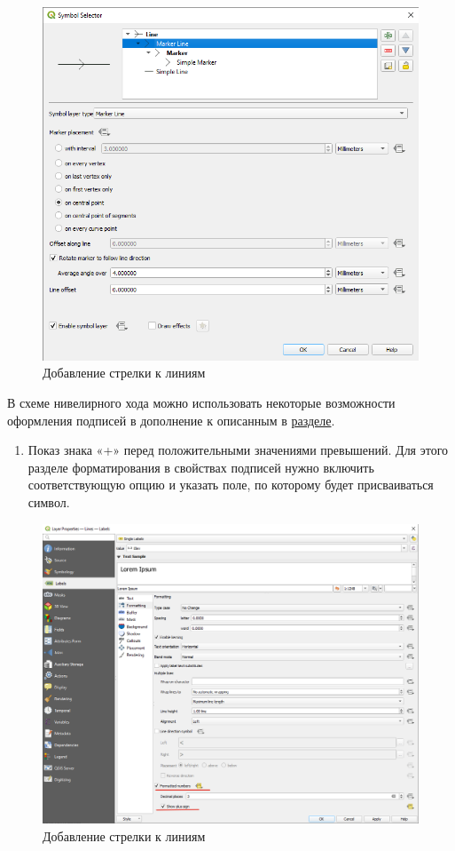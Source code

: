 \documentclass[
  12pt,
]{book}
\providecommand{\tightlist}{%
  \setlength{\itemsep}{0pt}\setlength{\parskip}{0pt}}
\begin{document}
\begin{figure}
\centering
\includegraphics{images/Practice/Arrow_setting.png}
\caption{Добавление стрелки к линиям}
\end{figure}

В схеме нивелирного хода можно использовать некоторые возможности оформления подписей в дополнение к описанным в \hyperref[practice-theod-symbology]{разделе}.

\begin{enumerate}
\def\labelenumi{\arabic{enumi})}
\tightlist
\item
  Показ знака «+» перед положительными значениями превышений. Для этого разделе форматирования в свойствах подписей нужно включить соответствующую опцию и указать поле, по которому будет присваиваться символ.
\end{enumerate}

\begin{figure}
\centering
\includegraphics{images/Practice/Plus_sign.png}
\caption{Добавление стрелки к линиям}
\end{figure}
\end{document}
